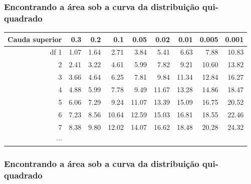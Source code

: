 \begin{frame}[fragile]
\frametitle{Encontrando a área sob a curva da distribuição qui-quadrado}

{\scriptsize
\begin{center}
\begin{tabular}{r | rrrr | rrrr |}
  \hline
Cauda superior & 0.3 & 0.2 & 0.1 & 0.05 & 0.02 & 0.01 & 0.005 & 0.001 \\ 
  \hline
df \hfill 1 &  1.07 &  1.64 &  2.71 &  3.84 &  5.41 &  6.63 &  7.88 &  10.83 \\ 
  2 &  2.41 &  3.22 &  4.61 &  5.99 &  7.82 &  9.21 &  10.60 &  13.82 \\ 
  3 &  3.66 &  4.64 &  6.25 &  7.81 &  9.84 &  11.34 &  12.84 &  16.27 \\ 
  4 &  4.88 &  5.99 &  7.78 &  9.49 &  11.67 &  13.28 &  14.86 &  18.47 \\ 
  5 &  6.06 &  7.29 &  9.24 &  11.07 &  13.39 &  15.09 &  16.75 &  20.52 \\ 
  \hline
  6 &  7.23 &  8.56 &  10.64 &  12.59 &  15.03 &  16.81 &  18.55 &  22.46 \\ 
  7 &  8.38 &  9.80 &  12.02 &  14.07 &  16.62 &  18.48 &  20.28 &  24.32 \\ 
  $\cdots$ &   &   &   &   &   &   &   &   \\ 
\end{tabular}
\end{center}
}

\end{frame}


\begin{frame}
\frametitle{Encontrando a área sob a curva da distribuição qui-quadrado}
\justifying
{}

{
}
\end{frame}

